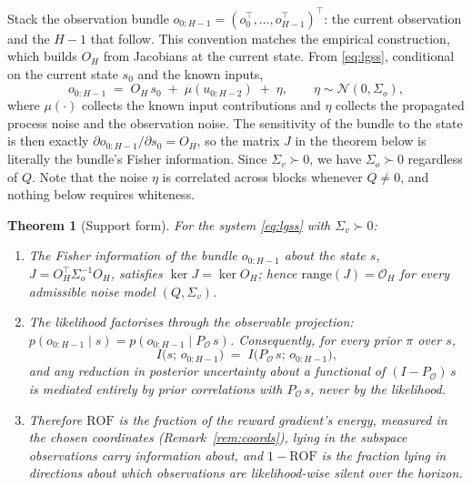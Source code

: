 \documentclass[11pt]{article}
\newtheorem{theorem}{Theorem}
\theoremstyle{remark}
\newcommand{\Obs}{\mathcal{O}}
\newcommand{\ROF}{\mathrm{ROF}}
\begin{document}
Stack the observation bundle $o_{0:H-1} = (o_0^\top, \dots, o_{H-1}^\top)^\top$: the current observation and the $H-1$ that follow. This convention matches the empirical construction, which builds $O_H$ from Jacobians at the current state. From \eqref{eq:lgss}, conditional on the current state $s_0$ and the known inputs,
\begin{equation}
o_{0:H-1} \;=\; O_H\, s_0 \;+\; \mu(u_{0:H-2}) \;+\; \eta,
\qquad \eta \sim \mathcal N(0, \Sigma_o),
\label{eq:bundle}
\end{equation}
where $\mu(\cdot)$ collects the known input contributions and $\eta$ collects the propagated process noise and the observation noise. The sensitivity of the bundle to the state is then exactly $\partial o_{0:H-1}/\partial s_0 = O_H$, so the matrix $J$ in the theorem below is literally the bundle's Fisher information. Since $\Sigma_v \succ 0$, we have $\Sigma_o \succ 0$ regardless of $Q$. Note that the noise $\eta$ is correlated across blocks whenever $Q \ne 0$, and nothing below requires whiteness.

\begin{theorem}[Support form]\label{thm:support}
For the system \eqref{eq:lgss} with $\Sigma_v \succ 0$:
\begin{enumerate}
\item[(a)] The Fisher information of the bundle $o_{0:H-1}$ about the state $s$,
$J = O_H^\top \Sigma_o^{-1} O_H$,
satisfies $\ker J = \ker O_H$; hence $\mathrm{range}(J) = \Obs_H$ for \emph{every} admissible noise model $(Q, \Sigma_v)$.
\item[(b)] The likelihood factorises through the observable projection:
$p(o_{0:H-1} \mid s) = p(o_{0:H-1} \mid P_{\Obs}\, s)$.
Consequently, for every prior $\pi$ over $s$,
\[
I\big(s;\, o_{0:H-1}\big) \;=\; I\big(P_{\Obs}\, s;\, o_{0:H-1}\big),
\]
and any reduction in posterior uncertainty about a functional of $(I - P_{\Obs})\,s$ is mediated entirely by prior correlations with $P_{\Obs}\, s$, never by the likelihood.
\item[(c)] Therefore $\ROF$ is the fraction of the reward gradient's energy, measured in the chosen coordinates (Remark~\ref{rem:coords}), lying in the subspace observations carry information about, and $1 - \ROF$ is the fraction lying in directions about which observations are likelihood-wise silent over the horizon.
\end{enumerate}
\end{theorem}
\end{document}
